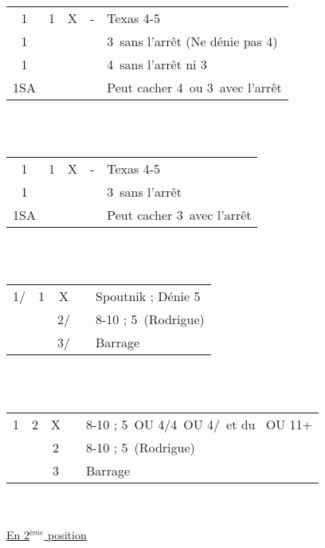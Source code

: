 \documentclass[a4paper, oneside, 11pt]{report}
\begin{document}
		\begin{tabular}{cccc|l}
		1\trefle & 1\carreau & X & - & Texas 4-5\coeur\\
		1\coeur &&&& 3\coeur\ sans l'arrêt (Ne dénie pas 4\pique)\\
		1\pique &&&& 4\pique\ sans l'arrêt ni 3\coeur\\
		1SA &&&& Peut cacher 4\pique\ ou 3\coeur\ avec l'arrêt \carreau\\
		\end{tabular}\\\\

		\begin{tabular}{cccc|l}
		1\trefle & 1\coeur & X & - & Texas 4-5\pique\\
		1\pique &&&& 3\pique\ sans l'arrêt\\
		1SA &&&& Peut cacher 3\pique\ avec l'arrêt \coeur\\
		\end{tabular}\\\\
		
		\begin{tabular}{cccc|l}
		1\trefle/\carreau & 1\pique & X && Spoutnik ; Dénie 5\coeur\\
		&& 2\trefle/\carreau && 8-10 ; 5\coeur\ (Rodrigue)\\
		&& 3\trefle/\carreau && Barrage\\
		\end{tabular}\\\\

		\begin{tabular}{cccc|l}
		1\carreau & 2\trefle & X && 8-10 ; 5\pique\ OU 4\coeur/4\pique\ OU 4\coeur/\pique\ et du \carreau\ OU 11+\\
		&& 2\carreau && 8-10 ; 5\coeur\ (Rodrigue)\\
		&& 3\carreau && Barrage\\
		\end{tabular}\\\\

	\underline{En 2$^{ème}$ position}
	
\end{document}
